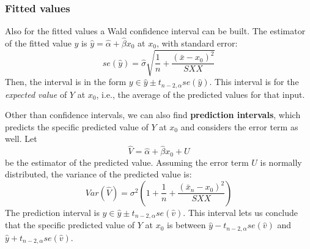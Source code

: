 \subsubsection{Fitted values}

Also for the fitted values a Wald confidence interval can be built. The estimator of the fitted value $y$ is $\hat{y} = \hat{\alpha} + \hat{\beta} x_0$ at $x_0$, with standard error:
\begin{equation*}
    se(\hat{y}) = \hat{\sigma} \sqrt{\frac{1}{n} + \frac{(\bar{x} - x_0)^2}{SXX}}
\end{equation*}
Then, the interval is in the form $y \in \hat{y} \pm t_{n-2,\alpha} se(\hat{y})$. This interval is for the \textit{expected value} of $Y$ at $x_0$, i.e., the average of the predicted values for that input.

Other than confidence intervals, we can also find \textbf{prediction intervals}, which predicts the specific predicted value of $Y$ at $x_0$ and considers the error term as well. Let
\begin{equation*}
    \hat{V} = \hat{\alpha} + \hat{\beta} x_0 + U
\end{equation*}
be the estimator of the predicted value. Assuming the error term $U$ is normally distributed, the variance of the predicted value is:
\begin{equation*}
    Var(\hat{V}) = \sigma^2 \left(1 + \frac{1}{n} + \frac{(\bar{x}_n - x_0)^2}{SXX} \right)
\end{equation*}
The prediction interval is $y \in \hat{y} \pm t_{n-2, \alpha} se(\hat{v})$. This interval lets us conclude that the specific predicted value of $Y$ at $x_0$ is between $\hat{y} - t_{n-2, \alpha}se(\hat{v})$ and $\hat{y} + t_{n-2, \alpha}se(\hat{v})$.